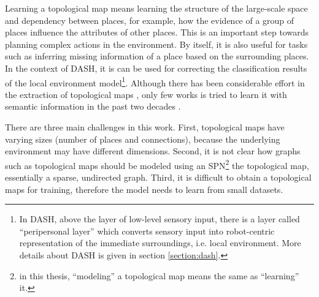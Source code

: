 \documentclass[10pt, titlepage]{article}
\theoremstyle{definition}
\begin{document}
Learning a topological map means learning the structure of the large-scale space and dependency between places, for example, how the evidence of a group of places influence the attributes of other places. This is an important step towards planning complex actions in the environment. By itself, it is also useful for tasks such as inferring missing information of a place based on the surrounding places. In the context of DASH, it is can be used for correcting the classification results of the local environment model\footnote{In DASH, above the layer of low-level sensory input, there is a layer called ``peripersonal layer'' which converts sensory input into robot-centric representation of the immediate surroundings, i.e. local environment. More details about DASH is given in section \ref{section:dash}.}. Although there has been considerable effort in the extraction of topological maps \cite{friedman2007voronoi}\cite{ranganathan2011online}\cite{shi2010online}\cite{tomatis2003hybrid}, only few works is tried to learn it with semantic information in the past two decades \cite{aydemir2012can}\cite{friedman2007voronoi}\cite{mozos2006supervised}.


There are three main challenges in this work. First, topological maps have varying sizes (number of places and connections), because the underlying environment may have different dimensions. Second, it is not clear how graphs such as topological maps should be modeled using an SPN\footnote{in this thesis, ``modeling'' a topological map means the same as ``learning'' it.} the topological map, essentially a sparse, undirected graph. Third, it is difficult to obtain a topological maps for training, therefore the model needs to learn from small datasets.

\end{document}
